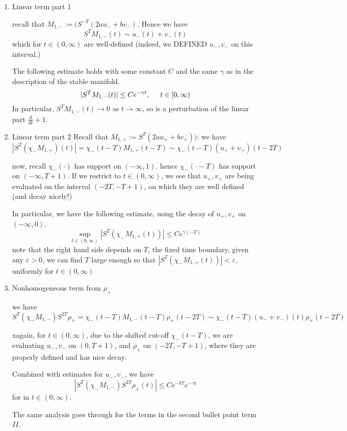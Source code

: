 \documentclass[letterpaper,11pt]{article}
\newcommand{\eps}{\varepsilon}
\numberwithin{equation}{section}
\theoremstyle{plain}
\begin{document}
\begin{enumerate}
\item Linear term part 1

recall that $M_{1,-} := (S^{-T}(2au_-+bv_-)$. Hence we have
\[
S^TM_{1,-} (t) \sim u_-(t)+v_-(t)
\]
which for $t \in (0,\infty)$ are well-defined (indeed, we DEFINED $u_- , v_-$ on this interval.)

The following estimate holds with some constant $C$ and the same  $\gamma$ as in the description of the stable manifold.
\[
|S^TM_{1,-}(t)| \le Ce^{-\gamma t}, \hspace{0.5cm} t \in [0,\infty)
\]
In particular, $S^TM_{1,-}(t) \to 0$ as $t \to \infty$, so is a perturbation of the linear part $\frac{d}{dt}+1$.




\item Linear term part 2
Recall that $M_{1,+}:=S^T(2au_++bv_+))$:
we have
\[
|S^T(\chi_-M_{1,+} )(t)| = \chi_-(t-T)M_{1,+}(t-T) \sim \chi_-(t-T) (u_++v_+)(t-2T)
\]

now, recall $\chi_-(\cdot)$ has support on $(-\infty,1)$. hence $\chi_-(\cdot-T)$ has support on $(-\infty,T+1)$. If we restrict to $t \in (0,\infty)$, we see that $u_+,v_+$ are being evaluated on the interval $(-2T, -T+1)$, on which they are well defined (and decay nicely!)


In particular, we have the following estimate, using the decay of $u_+,v_+$ on $(-\infty,0)$.
\[
\sup_{t \in (0,\infty)}|S^T(\chi_-M_{1,+}(t))| \le Ce^{\gamma(-T)}
\]
note that the right hand side depends on $T$, the fixed time boundary, given any $\eps>0$, we can find $T$ large enough so that $|S^T(\chi_-M_{1,+}(t))|< \eps$, uniformly for $t \in (0, \infty)$



\item Nonhomogeneous term from $\rho_+$

we have
\[
S^T(\chi_-M_{1,-})S^{2T}\rho_+ = \chi_-(t-T)M_{1,-}(t-T)\rho_+(t-2T) \sim \chi_-(t-T)(u_-+v_-)(t)\rho_+(t-2T)
\]

xagain, for $t\in (0,\infty)$, due to the shifted cut-off $\chi_-(t-T)$, we are evaluating $u_-,v_-$ on $(0,T+1)$, and $\rho_+$ on $(-2T, -T+1)$, where they are properly defined and has nice decay.

Combined with estimates for $u_-,v_-$, we have
\[
|S^T(\chi_-M_{1,-})S^{2T}\rho_+ (t) | \le Ce^{-\delta T}e^{-\gamma t}
\]
for in $t \in(0,\infty)$.

The same analysis goes through for the terms in the second bullet point term $II$.




\end{enumerate}
\end{document}
